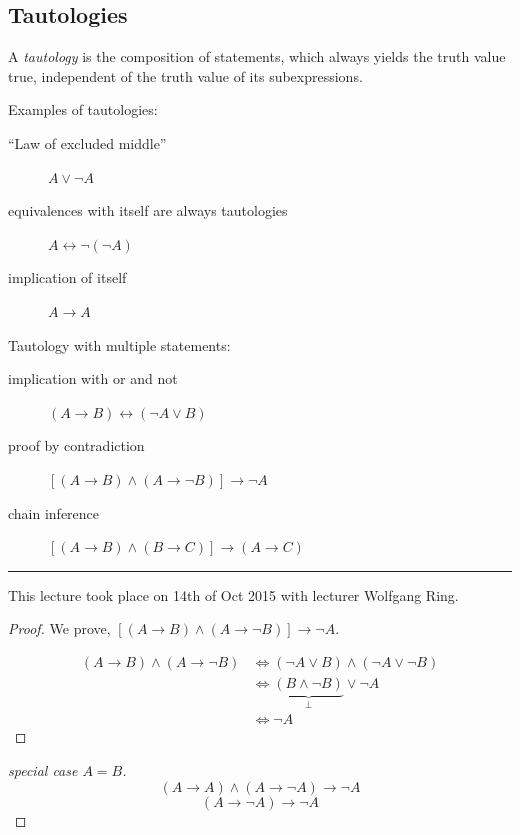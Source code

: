 \documentclass[a4paper,landscape,twocolumn]{article}
\theoremstyle{definition}
\newcommand\meta[3]{\hrule{} This #1 took place on #2 with lecturer #3.\par}
\begin{document}
\subsection{Tautologies}
%
A \emph{tautology} is the composition of statements, which always yields the truth value
true, independent of the truth value of its subexpressions.

Examples of tautologies:
\begin{description}
  \item[\enquote{Law of excluded middle}] $A \lor \neg A$
  \item[equivalences with itself are always tautologies] $A \leftrightarrow \neg (\neg A)$
  \item[implication of itself] $A \rightarrow A$
\end{description}

Tautology with multiple statements:
\begin{description}
  \item[implication with or and not] $(A \rightarrow B) \leftrightarrow (\neg A \lor B)$
  \item[proof by contradiction] $\left[(A \rightarrow B) \land (A \rightarrow \neg B)\right] \rightarrow \neg A$
  \item[chain inference] $\left[(A \rightarrow B) \land (B \rightarrow C)\right] \rightarrow (A \rightarrow C)$
\end{description}


\meta{lecture}{14th of Oct 2015}{Wolfgang Ring}

\begin{proof}
  We prove, $\left[(A \rightarrow B) \land (A \rightarrow \neg B)\right] \rightarrow \neg A$.

  \begin{align*}
    (A \rightarrow B) \land (A \rightarrow \neg B) &\iff (\neg A \lor B) \land (\neg A \lor \neg B) \\
      &\iff \underbrace{(B \land \neg B)}_{\bot} \lor \neg A \\
      &\iff \neg A
  \end{align*}
\end{proof}

\begin{proof}[special case $A = B$]
  \[ (A \rightarrow A) \land (A \rightarrow \neg A) \rightarrow \neg A \]
  \[ (A \rightarrow \neg A) \rightarrow \neg A \]
\end{proof}
\end{document}
